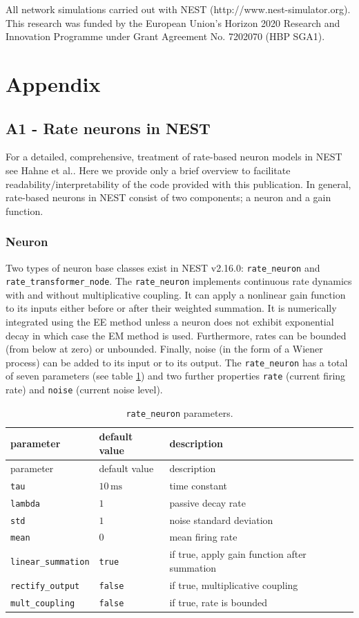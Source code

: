 \documentclass[10pt,a4paper,onecolumn]{article}
\begin{document}
All network simulations carried out with NEST
(http://www.nest-simulator.org). This research was funded by the
European Union's Horizon 2020 Research and Innovation Programme under
Grant Agreement No. 7202070 (HBP SGA1).

\section{Appendix}\label{appendix}

\subsection{A1 - Rate neurons in NEST}\label{a1---rate-neurons-in-nest}

For a detailed, comprehensive, treatment of rate-based neuron models in
NEST see Hahne et al.\autocite{Hahne2017}. Here we provide only a brief
overview to facilitate readability/interpretability of the code provided
with this publication. In general, rate-based neurons in NEST consist of
two components; a neuron and a gain function.

\subsubsection{Neuron}\label{neuron}

Two types of neuron base classes exist in NEST v2.16.0:
\texttt{rate\_neuron} and\\
\texttt{rate\_transformer\_node}. The \texttt{rate\_neuron} implements
continuous rate dynamics with and without multiplicative coupling. It
can apply a nonlinear gain function to its inputs either before or after
their weighted summation. It is numerically integrated using the EE
method unless a neuron does not exhibit exponential decay in which case
the EM method is used. Furthermore, rates can be bounded (from below at
zero) or unbounded. Finally, noise (in the form of a Wiener process) can
be added to its input or to its output. The \texttt{rate\_neuron} has a
total of seven parameters (see table \ref{tbl:table_2}) and two further
properties \texttt{rate} (current firing rate) and \texttt{noise}
(current noise level).

\begin{longtable}[]{@{}lll@{}}
\caption{\texttt{rate\_neuron} parameters.
\label{tbl:table_2}}\tabularnewline
\toprule
parameter & default value & description\tabularnewline
\midrule
\endfirsthead
\toprule
parameter & default value & description\tabularnewline
\midrule
\endhead
\texttt{tau} & \(10\,\mathrm{ms}\) & time constant\tabularnewline
\texttt{lambda} & \(1\) & passive decay rate\tabularnewline
\texttt{std} & \(1\) & noise standard deviation\tabularnewline
\texttt{mean} & \(0\) & mean firing rate\tabularnewline
\texttt{linear\_summation} & \texttt{true} & if true, apply gain
function after summation\tabularnewline
\texttt{rectify\_output} & \texttt{false} & if true, multiplicative
coupling\tabularnewline
\texttt{mult\_coupling} & \texttt{false} & if true, rate is
bounded\tabularnewline
\bottomrule
\end{longtable}
\end{document}
